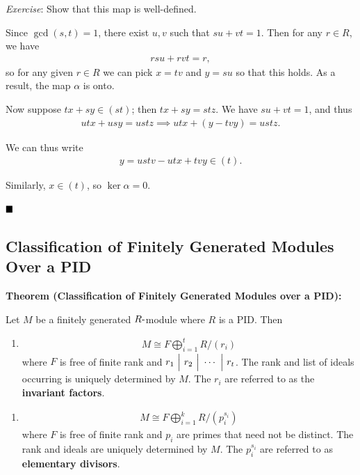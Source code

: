 \emph{Exercise}: Show that this map is well-defined.

Since \(\gcd(s, t) = 1\), there exist \(u, v\) such that
\(su + vt = 1\). Then for any \(r\in R\), we have
\begin{align*}
rsu + rvt = r
,\end{align*} so for any given \(r\in R\) we can pick \(x =tv\) and
\(y=su\) so that this holds. As a result, the map \(\alpha\) is onto.

Now suppose \(tx + sy \in (st)\); then \(tx + sy = stz\). We have
\(su + vt = 1\), and thus
\begin{align*}
utx + usy  = ustz \implies utx + (y-tvy) = ustz
.\end{align*}

We can thus write
\begin{align*}
y = ustv - utx + tvy  \in (t)
.\end{align*}

Similarly, \(x\in (t)\), so \(\ker \alpha = 0\).

\(\qed\)

\hypertarget{classification-of-finitely-generated-modules-over-a-pid}{%
\subsection{Classification of Finitely Generated Modules Over a
PID}\label{classification-of-finitely-generated-modules-over-a-pid}}

\textbf{Theorem (Classification of Finitely Generated Modules over a
PID):}

Let \(M\) be a finitely generated \(R{\hbox{-}}\)module where \(R\) is a PID.
Then

\begin{enumerate}
\def\labelenumi{\arabic{enumi}.}
\tightlist
\item

  \begin{align*}
  M \cong F \bigoplus_{i=1}^t R/(r_i)
  \end{align*} where \(F\) is free of finite rank and
  \(r_1 {~\Bigm| ~} r_2 {~\Bigm| ~} \cdots {~\Bigm| ~} r_t\). The rank and list
  of ideals occurring is uniquely determined by \(M\). The \(r_i\) are
  referred to as the \textbf{invariant factors}.
\end{enumerate}

\begin{enumerate}
\def\labelenumi{\alph{enumi}.}
\setcounter{enumi}{1}
\tightlist
\item

  \begin{align*}
  M \cong F \bigoplus_{i=1}^k R/(p_i^{s_i})
  \end{align*} where \(F\) is free of finite rank and \(p_i\) are primes
  that need not be distinct. The rank and ideals are uniquely determined
  by \(M\). The \(p_i^{s_i}\) are referred to as \textbf{elementary
  divisors}.
\end{enumerate}

